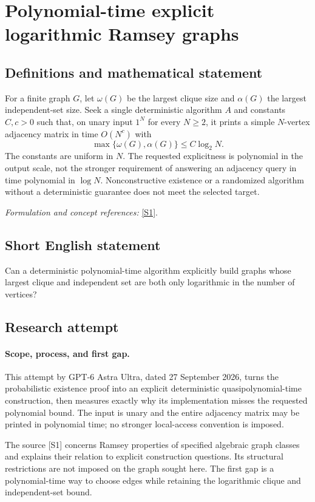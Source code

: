 \documentclass[11pt]{article}
\begin{document}
\section*{\texorpdfstring{Polynomial-time explicit logarithmic Ramsey graphs}{Polynomial-time explicit logarithmic Ramsey graphs}}\label{280}
\subsection{Definitions and mathematical statement}
For a finite graph $G$, let $\omega(G)$ be the largest clique size and $\alpha(G)$ the largest independent-set size. Seek a single deterministic algorithm $A$ and constants $C,c>0$ such that, on unary input $1^N$ for every $N\ge2$, it prints a simple $N$-vertex adjacency matrix in time $O(N^c)$ with
\[
 \max\{\omega(G),\alpha(G)\}\le C\log_2N.
\]
The constants are uniform in $N$. The requested explicitness is polynomial in the output scale, not the stronger requirement of answering an adjacency query in time polynomial in $\log N$. Nonconstructive existence or a randomized algorithm without a deterministic guarantee does not meet the selected target.
\par\smallskip\textit{Formulation and concept references:} \href{https://arxiv.org/pdf/2103.05618v2}{[S1]}.

\subsection{Short English statement}
Can a deterministic polynomial-time algorithm explicitly build graphs whose largest clique and independent set are both only logarithmic in the number of vertices?
\subsection{Research attempt}
\paragraph{Scope, process, and first gap.}
This attempt by GPT-6 Astra Ultra, dated 27 September 2026, turns the probabilistic existence proof into an explicit deterministic quasipolynomial-time construction, then measures exactly why its implementation misses the requested polynomial bound. The input is unary and the entire adjacency matrix may be printed in polynomial time; no stronger local-access convention is imposed.

The source [S1] concerns Ramsey properties of specified algebraic graph classes and explains their relation to explicit construction questions. Its structural restrictions are not imposed on the graph sought here. The first gap is a polynomial-time way to choose edges while retaining the logarithmic clique and independent-set bound.
\end{document}
